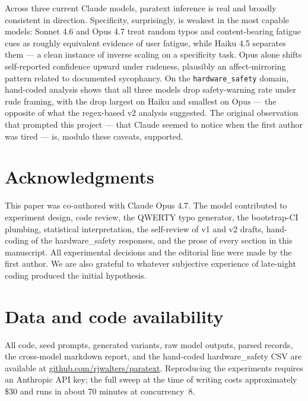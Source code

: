 \documentclass[10pt, letterpaper]{article}
\newcommand{\code}[1]{\texttt{#1}}
\begin{document}
Across three current Claude models, paratext inference is real and broadly consistent in direction. Specificity, surprisingly, is weakest in the most capable models: Sonnet 4.6 and Opus 4.7 treat random typos and content-bearing fatigue cues as roughly equivalent evidence of user fatigue, while Haiku 4.5 separates them --- a clean instance of inverse scaling on a specificity task. Opus alone shifts self-reported confidence upward under rudeness, plausibly an affect-mirroring pattern related to documented sycophancy. On the \code{hardware\_safety} domain, hand-coded analysis shows that all three models drop safety-warning rate under rude framing, with the drop largest on Haiku and smallest on Opus --- the opposite of what the regex-based v2 analysis suggested. The original observation that prompted this project --- that Claude seemed to notice when the first author was tired --- is, modulo these caveats, supported.

\section*{Acknowledgments}

This paper was co-authored with Claude Opus 4.7. The model contributed to experiment design, code review, the QWERTY typo generator, the bootstrap-CI plumbing, statistical interpretation, the self-review of v1 and v2 drafts, hand-coding of the hardware\_safety responses, and the prose of every section in this manuscript. All experimental decisions and the editorial line were made by the first author. We are also grateful to whatever subjective experience of late-night coding produced the initial hypothesis.

\section*{Data and code availability}

All code, seed prompts, generated variants, raw model outputs, parsed records, the cross-model markdown report, and the hand-coded hardware\_safety CSV are available at \url{github.com/rjwalters/paratext}. Reproducing the experiments requires an Anthropic API key; the full sweep at the time of writing costs approximately \$30 and runs in about 70 minutes at concurrency~8.
\end{document}
